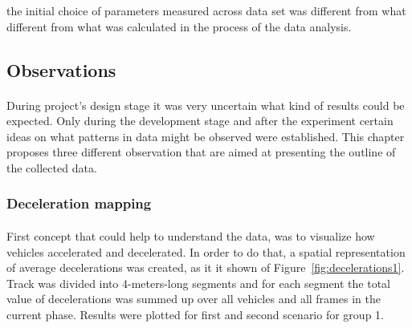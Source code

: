 \documentclass[11pt,english,twoside]{article}
\begin{document}
the initial choice of parameters measured across data set was different from what different from what was calculated in the process of the data analysis.



\subsection{Observations}


\paragraph{}

During project's design stage it was very uncertain what kind of results could be expected. Only during the development stage and after the experiment certain ideas on what patterns in data might be observed were established. This chapter proposes three different observation that are aimed at presenting the outline of the collected data. 











\subsubsection{Deceleration mapping}
\paragraph{}

First concept that could help to understand the data, was to visualize how vehicles accelerated and decelerated. In order to do that, a spatial representation of average decelerations was created, as it it shown of Figure~\ref{fig:decelerations1}. Track was divided into 4-meters-long segments and for each segment the total value of decelerations was summed up over all vehicles and all frames in the current phase. Results were plotted for first and second scenario for group 1.
\end{document}
